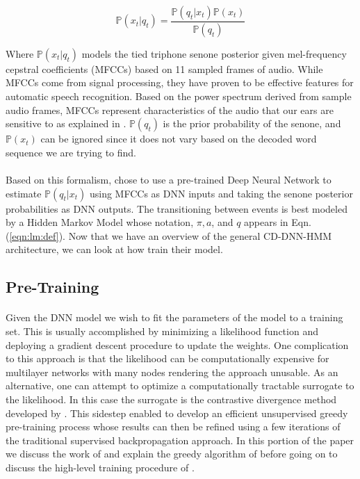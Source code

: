 \documentclass[letterpaper]{article}
\newcommand{\cprob}[2]{ \prob{#1 \lvert #2} }
\newcommand{\prob}[1]{\mathbb{P}\left( #1 \right)}
\newcommand{\DNN}{Deep Neural Network\xspace}
\newcommand{\HMM}{Hidden Markov Model\xspace}
\begin{document}
\begin{equation*}
	\cprob{x_t}{q_t} = \frac{\cprob{q_t}{x_t} \prob{x_t}}{\prob{q_t}}
	\label{eqn:senone:def}	
\end{equation*}

Where $\cprob{x_t}{q_t}$ models the tied triphone senone posterior given mel-frequency cepstral coefficients (MFCCs) based on 11 sampled frames of audio. While MFCCs come from signal processing, they have proven to be effective features for automatic speech recognition. Based on the power spectrum derived from sample audio frames, MFCCs 
represent characteristics of the audio that our ears are sensitive to as explained in \cite{adami2010automatic}.  $\prob{q_t}$ is the prior probability of the senone, and $\prob{x_t}$ can be ignored since it does not vary based on the decoded word sequence we are trying to find.

\paragraph{} Based on this formalism, \cite{DBLP:journals/taslp/DahlYDA12} chose to use a pre-trained \DNN to estimate $\cprob{q_t}{x_t}$ using MFCCs as DNN inputs and taking the senone posterior probabilities as DNN outputs. The transitioning between events is best modeled by a \HMM whose notation, $\pi, a$, and $q$ appears in Eqn. (\ref{eqn:lm:def}). Now that we have an overview of the general CD-DNN-HMM architecture, we can look at how \cite{DBLP:journals/taslp/DahlYDA12} train their model.

\subsection*{Pre-Training}

\paragraph{} Given the DNN model we wish to fit the parameters of the model to a training set. This is usually accomplished by minimizing a likelihood function and deploying a gradient descent procedure to update the weights. One complication to this approach is that the likelihood can be computationally expensive for multilayer networks with many nodes rendering the approach unusable. As an alternative, one can attempt to optimize a computationally tractable surrogate to the likelihood. In this case the surrogate is the contrastive divergence method developed by \cite{DBLP:journals/neco/Hinton02}. This sidestep enabled \cite{DBLP:journals/neco/HintonOT06} to develop an efficient unsupervised greedy pre-training process whose results can then be refined using a few iterations of the traditional supervised backpropagation approach. In this portion of the paper we discuss the work of \cite{DBLP:journals/neco/Hinton02} and explain the greedy algorithm of \cite{DBLP:journals/neco/HintonOT06} before going on to discuss the high-level training procedure of \cite{DBLP:journals/taslp/DahlYDA12}.
\end{document}
